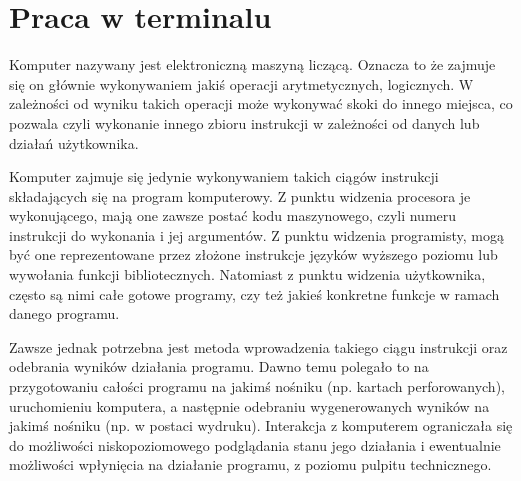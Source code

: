 % 
% 
% 
% 

\section{Praca w terminalu}

Komputer nazywany jest elektroniczną maszyną liczącą. Oznacza to że zajmuje się on głównie wykonywaniem jakiś operacji arytmetycznych, logicznych.
W zależności od wyniku takich operacji może wykonywać skoki do innego miejsca, co pozwala czyli wykonanie innego zbioru instrukcji w zależności od danych lub działań użytkownika.

Komputer zajmuje się jedynie wykonywaniem takich ciągów instrukcji składających się na program komputerowy.
Z punktu widzenia procesora je wykonującego, mają one zawsze postać kodu maszynowego, czyli numeru instrukcji do wykonania i jej argumentów.
Z punktu widzenia programisty, mogą być one reprezentowane przez złożone instrukcje języków wyższego poziomu lub wywołania funkcji bibliotecznych.
Natomiast z punktu widzenia użytkownika, często są nimi całe gotowe programy, czy też jakieś konkretne funkcje w ramach danego programu.

Zawsze jednak potrzebna jest metoda wprowadzenia takiego ciągu instrukcji oraz odebrania wyników działania programu.
Dawno temu polegało to na przygotowaniu całości programu na jakimś nośniku (np. kartach perforowanych), uruchomieniu komputera, a następnie odebraniu wygenerowanych wyników na jakimś nośniku (np. w postaci wydruku).
Interakcja z komputerem ograniczała się do możliwości niskopoziomowego podglądania stanu jego działania i ewentualnie możliwości wpłynięcia na działanie programu, z poziomu pulpitu technicznego.

